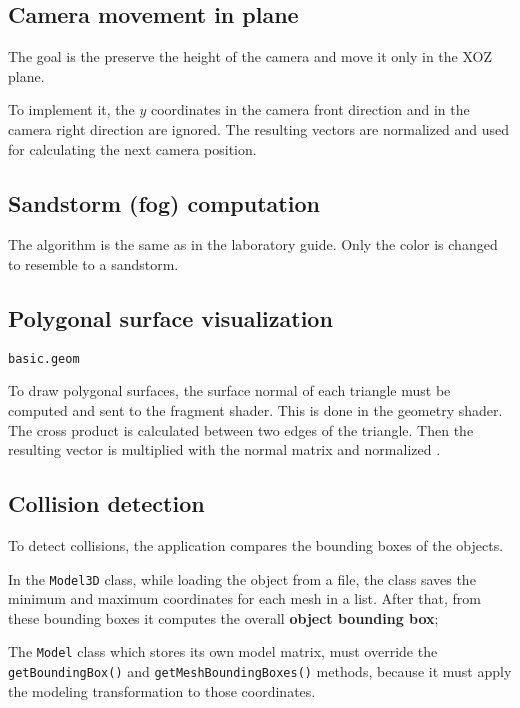 \subsection{Camera movement in plane}

The goal is the preserve the height of the camera and move it only in the XOZ plane. 

To implement it, the $y$ coordinates in the camera front direction and in the camera right direction are ignored. The resulting vectors are normalized and used for calculating the next camera position.





\subsection{Sandstorm (fog) computation}

The algorithm is the same as in the laboratory guide. Only the color is changed to resemble to a sandstorm.





\subsection{Polygonal surface visualization}

\verb|basic.geom|

To draw polygonal surfaces, the surface normal of each triangle must be computed and sent to the fragment shader. This is done in the geometry shader. The cross product is calculated between two edges of the triangle. Then the resulting vector is multiplied with the normal matrix and normalized \cite{learnopengl}.





\subsection{Collision detection}

To detect collisions, the application compares the bounding boxes of the objects. 

In the \verb|Model3D| class, while loading the object from a file, the class saves the minimum and maximum coordinates for each mesh in a list. After that, from these bounding boxes it computes the overall \textbf{object bounding box};

The \verb|Model| class which stores its own model matrix, must override the \verb|getBoundingBox()| and \verb|getMeshBoundingBoxes()| methods, because it must apply the modeling transformation to those coordinates.

